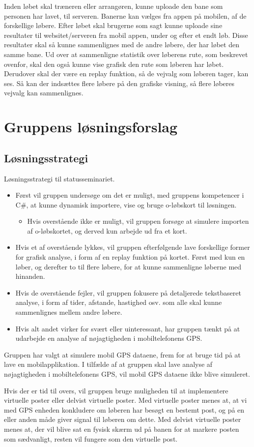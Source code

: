Inden løbet skal træneren eller arrangøren, kunne uploade den bane som personen har lavet, til serveren. Banerne kan vælges fra appen på mobilen, af de forskellige løbere. Efter løbet skal brugerne som sagt kunne uploade sine resultater til websitet/serveren fra mobil appen, under og efter et endt løb. Disse resultater skal så kunne sammenlignes med de andre løbere, der har løbet den samme bane. Ud over at sammenligne statistik over løberens rute, som beskrevet ovenfor, skal den også kunne vise grafisk den rute som løberen har løbet. Derudover skal der være en replay funktion, så de vejvalg som løberen tager, kan ses. Så kan der indsættes flere løbere på den grafiske visning, så flere løberes vejvalg kan sammenlignes.

\section{Gruppens løsningsforslag}
\subsection {Løsningsstrategi}
Løsningsstrategi til statusseminariet.
\begin{itemize}
\item Først vil gruppen undersøge om det er muligt, med gruppens kompetencer i C\#, at kunne dynamisk importere, vise og bruge o-løbskort til løsningen.
\begin{itemize}
\item Hvis overstående ikke er muligt, vil gruppen forsøge at simulere importen af o-løbskortet, og derved kun arbejde ud fra et kort.
\end{itemize}
\item Hvis et af overstående lykkes, vil gruppen efterfølgende lave forskellige former for grafisk analyse, i form af en replay funktion på kortet. Først med kun en løber, og derefter to til flere løbere, for at kunne sammenligne løberne med hinanden.
\item Hvis de overstående fejler, vil gruppen fokusere på detaljerede tekstbaseret analyse, i form af tider, afstande, hastighed osv. som alle skal kunne sammenlignes mellem andre løbere.
\item Hvis alt andet virker for svært eller uinteressant, har gruppen tænkt på at udarbejde en analyse af nøjagtigheden i mobiltelefonens GPS.
\end{itemize}
Gruppen har valgt at simulere mobil GPS dataene, frem for at bruge tid på at lave en mobilapplikation. I tilfælde af at gruppen skal lave analyse af nøjagtigheden i mobiltelefonens GPS, vil mobil GPS dataene ikke blive simuleret. 
 
Hvis der er tid til overs, vil gruppen bruge muligheden til at implementere virtuelle poster eller delvist virtuelle poster. Med virtuelle poster menes at, at vi med GPS enheden konkludere om løberen har besøgt en bestemt post, og på en eller anden måde giver signal til løberen om dette. Med delvist virtuelle poster menes at, der vil blive sat en fysisk skærm ud på banen for at markere posten som sædvanligt, resten vil fungere som den virtuelle post.




